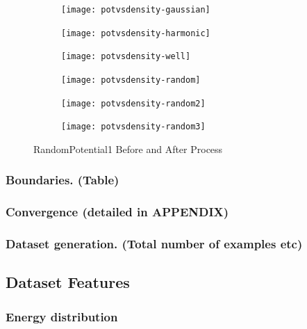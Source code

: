 \documentclass[a4paper,times,12pt]{article}
\begin{document}
\graphicspath{{"../figs/potentials/"}}
\begin{figure}[H]
    \centering
    \begin{subfigure}[t]{0.45\textwidth}
        \texttt{[image: potvsdensity-gaussian]}
    \end{subfigure}
    \begin{subfigure}[t]{0.45\textwidth}
        \texttt{[image: potvsdensity-harmonic]}
    \end{subfigure}
    \begin{subfigure}[t]{0.45\textwidth}
        \texttt{[image: potvsdensity-well]}
    \end{subfigure}
    \begin{subfigure}[t]{0.45\textwidth}
        \texttt{[image: potvsdensity-random]}
    \end{subfigure}
    \begin{subfigure}[t]{0.45\textwidth}
        \texttt{[image: potvsdensity-random2]}
    \end{subfigure}
    \begin{subfigure}[t]{0.45\textwidth}
        \texttt{[image: potvsdensity-random3]}
    \end{subfigure}
\caption{RandomPotential1 Before and After Process}
\label{fig:random3_before_after}
\end{figure}





\subsubsection{Boundaries. (Table)}
\subsubsection{Convergence (detailed in APPENDIX)}
\subsubsection{Dataset generation. (Total number of examples etc)}

\subsection{Dataset Features}
\subsubsection{Energy distribution}
\end{document}
